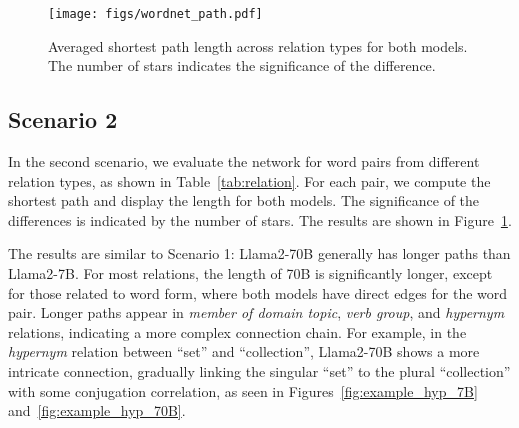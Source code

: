


\begin{figure}
    \centering
    \texttt{[image: figs/wordnet\_path.pdf]}
    \caption{Averaged shortest path length across relation types for both models. The number of stars indicates the significance of the difference.}
    \label{fig:wordnet_path}
\end{figure}

\subsection{Scenario 2}
In the second scenario, we evaluate the network for word pairs from different relation types, as shown in Table~\ref{tab:relation}. For each pair, we compute the shortest path and display the length for both models. The significance of the differences is indicated by the number of stars. The results are shown in Figure~\ref{fig:wordnet_path}.





The results are similar to Scenario 1: Llama2-70B generally has longer paths than Llama2-7B. For most relations, the length of 70B is significantly longer, except for those related to word form, where both models have direct edges for the word pair. Longer paths appear in \textit{member of domain topic}, \textit{verb group}, and \textit{hypernym} relations, indicating a more complex connection chain. For example, in the \textit{hypernym} relation between ``set'' and ``collection'', Llama2-70B shows a more intricate connection, gradually linking the singular ``set'' to the plural ``collection'' with some conjugation correlation, as seen in Figures~\ref{fig:example_hyp_7B} and~\ref{fig:example_hyp_70B}.


